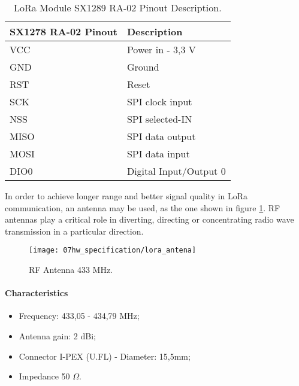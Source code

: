 \begin{table}[H]
	\centering
		\begin{tabular}{|m{5cm}|m{6cm}|}
			\hline
			\textbf{SX1278 RA-02 Pinout} & \textbf{Description}
			\\\hline\hline
		
			VCC & Power in - 3,3 V\\\hline
			GND & Ground\\\hline
			RST & Reset \\\hline
			SCK & SPI clock input\\\hline
			NSS & SPI selected-IN\\\hline
			MISO & SPI data output\\\hline
			MOSI & SPI data input\\\hline
			DIO0 & Digital Input/Output 0\\\hline
			\hline
		\end{tabular}
	
	\caption{LoRa Module SX1289 RA-02 Pinout Description.}
	\label{table:lora_module_pinout}
\end{table}

In order to achieve longer range and better signal quality in LoRa communication, an antenna may be used, as the one shown in figure \ref{fig:lora_antena}. RF antennas play a critical role in diverting, directing or concentrating radio wave transmission in a particular direction. 


\begin{figure}[H]
	\centering
	\texttt{[image: 07hw\_specification/lora\_antena]}
	\caption{RF Antenna 433 MHz.}
	\label{fig:lora_antena}
\end{figure}

\paragraph*{Characteristics}
\begin{itemize}
	\item Frequency: 433,05 - 434,79 MHz;
	\item Antenna gain: 2 dBi;
	\item Connector I-PEX (U.FL) - Diameter: 15,5mm;
	\item Impedance 50 $\Omega$.
\end{itemize}

